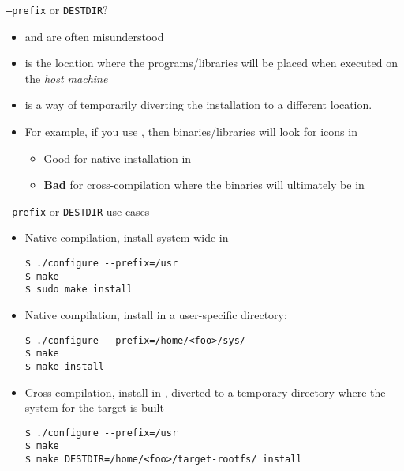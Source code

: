 \begin{frame}{{\tt --prefix} or {\tt DESTDIR}?}
  \begin{itemize}
  \item {} and  are often misunderstood
  \item {} is the location where the programs/libraries
    will be placed when executed on the {\em host machine}
  \item {} is a way of temporarily diverting the
    installation to a different location.

  \item For example, if you use ,
    then binaries/libraries will look for icons in
    \begin{itemize}
    \item Good for native installation in 
    \item {\bf Bad} for cross-compilation where the binaries will
      ultimately be in 
    \end{itemize}

  \end{itemize}
\end{frame}

\begin{frame}[fragile]{{\tt --prefix} or {\tt DESTDIR} use cases}
  \begin{itemize}
  \item Native compilation, install system-wide in 
    \begin{block}{}
{\tiny
\begin{verbatim}
$ ./configure --prefix=/usr
$ make
$ sudo make install
\end{verbatim}}
\end{block}
\item Native compilation, install in a user-specific directory:
  \begin{block}{}
{\tiny
\begin{verbatim}
$ ./configure --prefix=/home/<foo>/sys/
$ make
$ make install
\end{verbatim}}
\end{block}
\item Cross-compilation, install in , diverted to a
  temporary directory where the system for the target is built
  \begin{block}{}
{\tiny
\begin{verbatim}
$ ./configure --prefix=/usr
$ make
$ make DESTDIR=/home/<foo>/target-rootfs/ install
\end{verbatim}}
\end{block}

\end{itemize}

\end{frame}

